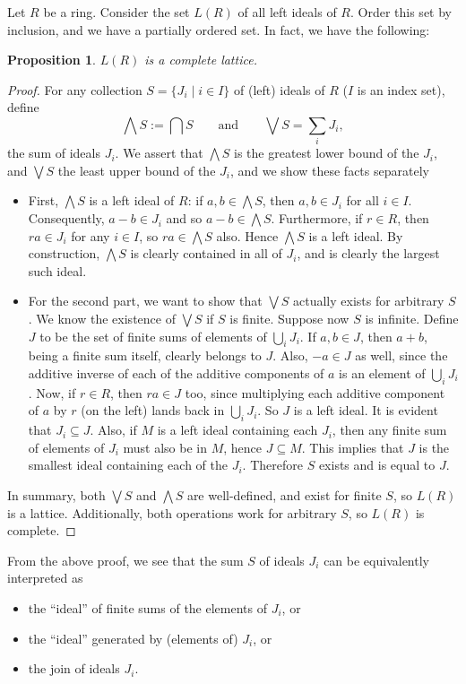\documentclass[12pt]{article}
\newtheorem{prop}{Proposition}
\begin{document}
Let $R$ be a ring.  Consider the set $L(R)$ of all left ideals of $R$.  Order this set by inclusion, and we have a partially ordered set.  In fact, we have the following:

\begin{prop}  $L(R)$ is a complete lattice. \end{prop}
\begin{proof}
For any collection $S=\lbrace J_i\mid i\in I\rbrace$ of (left) ideals of $R$ ($I$ is an index set), define $$\bigwedge S:=\bigcap S\qquad\mbox{and}\qquad\bigvee S=\sum_i J_i,$$ the sum of ideals $J_i$.  We assert that $\bigwedge S$ is the greatest lower bound of the $J_i$, and $\bigvee S$ the least upper bound of the $J_i$, and we show these facts separately
\begin{itemize}
\item
First, $\bigwedge S$ is a left ideal of $R$: if $a,b\in \bigwedge S$, then $a,b\in J_i$ for all $i\in I$.  Consequently, $a-b\in J_i$ and so $a-b\in \bigwedge S$.  Furthermore, if $r\in R$, then $ra\in J_i$ for any $i\in I$, so $ra\in \bigwedge S$ also.  Hence $\bigwedge S$ is a left ideal.  By construction, $\bigwedge S$ is clearly contained in all of $J_i$, and is clearly the largest such ideal.
\item
For the second part, we want to show that $\bigvee S$ actually exists for arbitrary $S$.  We know the existence of $\bigvee S$ if $S$ is finite.  Suppose now $S$ is infinite.  Define $J$ to be the set of finite sums of elements of $\bigcup_i J_i$.  If $a,b\in J$, then $a+b$, being a finite sum itself, clearly belongs to $J$.  Also, $-a\in J$ as well, since the additive inverse of each of the additive components of $a$ is an element of $\bigcup_i J_i$.  Now, if $r\in R$, then $ra\in J$ too, since multiplying each additive component of $a$ by $r$ (on the left) lands back in $\bigcup_i J_i$.  So $J$ is a left ideal.  It is evident that $J_i\subseteq J$.  Also, if $M$ is a left ideal containing each $J_i$, then any finite sum of elements of $J_i$ must also be in $M$, hence $J\subseteq M$.  This implies that $J$ is the smallest ideal containing each of the $J_i$.  Therefore $S$ exists and is equal to $J$.
\end{itemize}
In summary, both $\bigvee S$ and $\bigwedge S$ are well-defined, and exist for finite $S$, so $L(R)$ is a lattice.  Additionally, both operations work for arbitrary $S$, so $L(R)$ is complete.
\end{proof}

From the above proof, we see that the sum $S$ of ideals $J_i$ can be equivalently interpreted as
\begin{itemize}
\item the ``ideal'' of finite sums of the elements of $J_i$, or
\item the ``ideal'' generated by (elements of) $J_i$, or
\item the join of ideals $J_i$.
\end{itemize}
\end{document}
